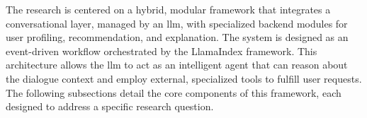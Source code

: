 The research is centered on a hybrid, modular framework that integrates a conversational layer, managed by an \ac{llm}, with specialized backend modules for user profiling, recommendation, and explanation. The system is designed as an event-driven workflow orchestrated by the LlamaIndex framework. This architecture allows the \ac{llm} to act as an intelligent agent that can reason about the dialogue context and employ external, specialized tools to fulfill user requests. The following subsections detail the core components of this framework, each designed to address a specific research question.